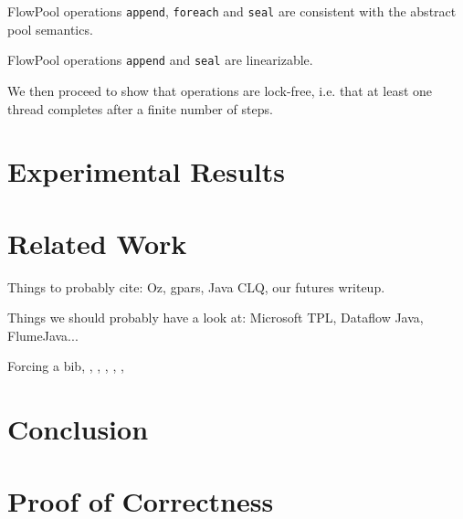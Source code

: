 \documentclass[runningheads,a4paper]{llncs}
\begin{document}
\begin{theorem}[Safety]
FlowPool operations \verb=append=, \verb=foreach=
and \verb=seal= are consistent with the abstract pool semantics.
\end{theorem}


\begin{theorem}
FlowPool operations \verb=append= and \verb=seal= are linearizable.
\end{theorem}

We then proceed to show that operations are lock-free, i.e. that at
least one thread completes after a finite number of steps.


\section{Experimental Results}

\section{Related Work}
Things to probably cite: Oz, gpars, Java CLQ, our futures writeup.

Things we should probably have a look at: Microsoft TPL, Dataflow
Java, FlumeJava...

Forcing a bib, \cite{bowman:reasoning}, \cite{braams:babel}, \cite{clark:pct}, \cite{herlihy:methodology}, \cite{Lamport:LaTeX}, \cite{salas:calculus}

\section{Conclusion}






\appendix
\section{Proof of Correctness}


\setcounter{lemma}{0}
\setcounter{theorem}{0}
\setcounter{corollary}{0}
\setcounter{definition}{0}
\end{document}
